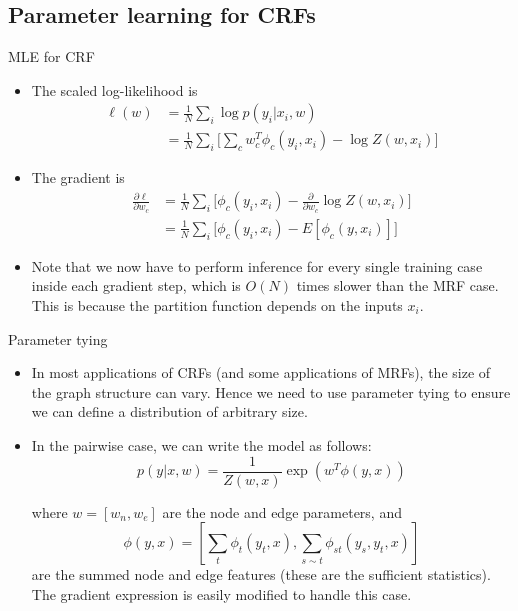 \documentclass[10pt,mathserif]{beamer}
\begin{document}
\subsection{Parameter learning for CRFs}
\begin{frame}{MLE for CRF}
\begin{itemize}
    \item The scaled log-likelihood is
    \begin{equation}
        \begin{split}
            \ell(w) & = \frac{1}{N}\sum_i\log p(y_i|x_i,w)\\
            & = \frac{1}{N}\sum_i\bigg[\sum_c w_c^T\phi_c(y_i,x_i)-\log Z(w,x_i)\bigg] 
        \end{split}
    \end{equation}
    
    \item The gradient is
    \begin{equation}
        \begin{split}
            \frac{\partial\ell}{\partial w_c} & = \frac{1}{N}\sum_i\bigg[\phi_c(y_i,x_i)-\frac{\partial}{\partial w_c}\log Z(w,x_i)\bigg] \\
            & = \frac{1}{N}\sum_i\bigg[\phi_c(y_i,x_i)- E[\phi_c(y,x_i)]\bigg] 
        \end{split}    
    \end{equation}
    
    \item Note that we now have to perform inference for every single training case inside each gradient step, which is $O(N)$ times slower than the MRF case. This is because the partition function depends on the inputs $x_i$.
\end{itemize}
\end{frame}

\begin{frame}{Parameter tying}
\begin{itemize}
    \item In most applications of CRFs (and some applications of MRFs), the size of the graph structure can vary. Hence we need to use parameter tying to ensure we can define a distribution of arbitrary size.
    \item In the pairwise case, we can write the model as follows:
    \begin{equation}
        p(y|x, w) = \frac{1}{Z(w,x)} \exp(w^T \phi(y, x))
    \end{equation}
    
    where $w = [w_n,w_e]$ are the node and edge parameters, and
    \begin{equation}
        \phi(y,x) = [ \sum_t\phi_t(y_t,x), \sum_{s \sim t}\phi_{st}(y_s,y_t,x)]
    \end{equation}
    are the summed node and edge features (these are the sufficient statistics). The gradient expression is easily modified to handle this case.
\end{itemize}
\end{frame}
\end{document}

